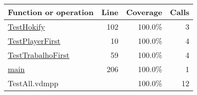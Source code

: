 \bigskip
\begin{longtable}{|l|r|r|r|}
\hline
Function or operation & Line & Coverage & Calls \\
\hline
\hline
\hyperref[TestHokify:102]{TestHokify} & 102&100.0\% & 3 \\
\hline
\hyperref[TestPlayerFirst:10]{TestPlayerFirst} & 10&100.0\% & 4 \\
\hline
\hyperref[TestTrabalhoFirst:59]{TestTrabalhoFirst} & 59&100.0\% & 4 \\
\hline
\hyperref[main:206]{main} & 206&100.0\% & 1 \\
\hline
\hline
TestAll.vdmpp & & 100.0\% & 12 \\
\hline
\end{longtable}

